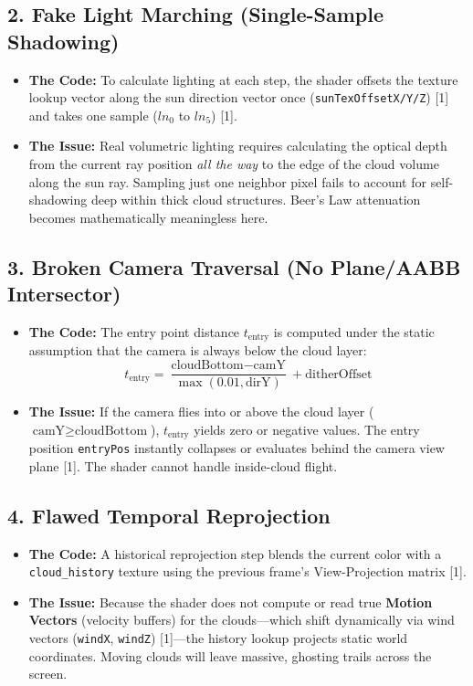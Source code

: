 \documentclass[11pt,a4paper]{article}
\begin{document}
\subsection{2. Fake Light Marching (Single-Sample Shadowing)}
\begin{itemize}
    \item \textbf{The Code:} To calculate lighting at each step, the shader offsets the texture lookup vector along the sun direction vector once (\texttt{sunTexOffsetX/Y/Z}) [1] and takes one sample ($ln_0$ to $ln_5$) [1].
    \item \textbf{The Issue:} Real volumetric lighting requires calculating the optical depth from the current ray position \textit{all the way} to the edge of the cloud volume along the sun ray. Sampling just one neighbor pixel fails to account for self-shadowing deep within thick cloud structures. Beer's Law attenuation becomes mathematically meaningless here.
\end{itemize}

\subsection{3. Broken Camera Traversal (No Plane/AABB Intersector)}
\begin{itemize}
    \item \textbf{The Code:} The entry point distance $t_{\text{entry}}$ is computed under the static assumption that the camera is always below the cloud layer:
    \begin{equation}
        t_{\text{entry}} = \frac{\text{cloudBottom} - \text{camY}}{\max(0.01, \text{dirY})} + \text{ditherOffset}
    \end{equation}
    \item \textbf{The Issue:} If the camera flies into or above the cloud layer ($\text{camY} \ge \text{cloudBottom}$), $t_{\text{entry}}$ yields zero or negative values. The entry position \texttt{entryPos} instantly collapses or evaluates behind the camera view plane [1]. The shader cannot handle inside-cloud flight.
\end{itemize}

\subsection{4. Flawed Temporal Reprojection}
\begin{itemize}
    \item \textbf{The Code:} A historical reprojection step blends the current color with a \texttt{cloud\_history} texture using the previous frame's View-Projection matrix [1].
    \item \textbf{The Issue:} Because the shader does not compute or read true \textbf{Motion Vectors} (velocity buffers) for the clouds---which shift dynamically via wind vectors (\texttt{windX}, \texttt{windZ}) [1]---the history lookup projects static world coordinates. Moving clouds will leave massive, ghosting trails across the screen.
\end{itemize}
\end{document}
